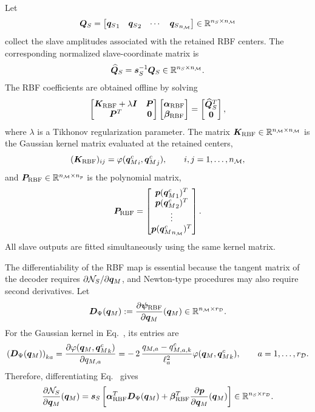 \documentclass[11pt,a4paper]{article}
\begin{document}
Let
\[
    \bm{Q}_{S}
    =
    \begin{bmatrix}
    {\bm{q}_{S}}_1 & {\bm{q}_{S}}_2 & \cdots & {\bm{q}_{S}}_{n_{\mathcal{M}}}
    \end{bmatrix}
    \in
    \mathbb{R}^{n_{S}\times n_{\mathcal{M}}}
\]
collect the slave amplitudes associated with the retained RBF centers. The
corresponding normalized slave-coordinate matrix is
\[
    \widehat{\bm{Q}}_{S}
    =
    \bm{s}_{S}^{-1}\bm{Q}_{S}
    \in
    \mathbb{R}^{n_{S}\times n_{\mathcal{M}}}.
\]
The RBF coefficients are obtained offline by solving
\begin{equation}
\label{eq:RBF_augmented_system}
\begin{bmatrix}
\bm{K}_{\mathrm{RBF}}+\lambda\bm{I} & \bm{P}\\
\bm{P}^T & \bm{0}
\end{bmatrix}
\begin{bmatrix}
\bm{\alpha}_{\mathrm{RBF}}\\
\bm{\beta}_{\mathrm{RBF}}
\end{bmatrix}
=
\begin{bmatrix}
\widehat{\bm{Q}}_{S}^T\\
\bm{0}
\end{bmatrix},
\end{equation}
where $\lambda$ is a Tikhonov regularization parameter. The matrix
$\bm{K}_{\mathrm{RBF}}\in\mathbb{R}^{n_{\mathcal{M}}\times n_{\mathcal{M}}}$ is the Gaussian kernel matrix evaluated
at the retained centers,
\[
    (\bm{K}_{\mathrm{RBF}})_{ij}
    =
    \varphi({\bm{q}_M^{c}}_i,{\bm{q}_M^{c}}_j),
    \qquad
    i,j=1,\ldots,n_{\mathcal{M}},
\]
and $\bm{P}_{\mathrm{RBF}}\in\mathbb{R}^{n_{\mathcal{M}}\times n_p}$ is the polynomial matrix,
\[
    \bm{P}_{\mathrm{RBF}}
    =
    \begin{bmatrix}
    \bm{p}({\bm{q}_M^{c}}_1)^T\\
    \bm{p}({\bm{q}_M^{c}}_2)^T\\
    \vdots\\
    \bm{p}({\bm{q}_M^{c}}_{n_{\mathcal{M}}})^T
    \end{bmatrix}.
\]
All slave outputs are fitted simultaneously using the same kernel matrix.

%
%
%


The differentiability of the RBF map is essential because the tangent matrix of
the decoder requires $\partial\mathcal{N}_{S}/\partial\bm{q}_M$, and Newton-type procedures
may also require second derivatives. Let
\[
    \bm{D}_{\Psi}(\bm{q}_M)
    :=
    \dfrac{\partial \bm{\psi}_{\mathrm{RBF}}}{\partial \bm{q}_M}(\bm{q}_M)
    \in\mathbb{R}^{n_{\mathcal{M}}\times r_{\mathcal{D}}}.
\]
For the Gaussian kernel in Eq.~, its entries are
\[
    \left(\bm{D}_{\Psi}(\bm{q}_M)\right)_{ka}
    =
    \dfrac{\partial \varphi(\bm{q}_M,{\bm{q}_M^{c}}_k)}{\partial q_{M,a}}
    =
    -\,2\,
    \frac{q_{M,a}-q^c_{M,a,k}}{\ell_a^2}
    \varphi(\bm{q}_M,{\bm{q}_M^{c}}_k),
    \qquad
    a=1,\ldots,r_{\mathcal{D}} .
\]
Therefore, differentiating Eq.~ gives
\begin{equation}
\label{eq:RBF_slave_jacobian}
    \dfrac{\partial \mathcal{N}_{S}}{\partial \bm{q}_M}(\bm{q}_M)
    =
    \bm{s}_{S}
    \left[
    \bm{\alpha}_{\mathrm{RBF}}^T\bm{D}_{\Psi}(\bm{q}_M)
    +
    \bm{\beta}_{\mathrm{RBF}}^T
    \dfrac{\partial \bm{p}}{\partial \bm{q}_M}(\bm{q}_M)
    \right]
    \in\mathbb{R}^{n_{S}\times r_{\mathcal{D}}}.
\end{equation}
\end{document}
